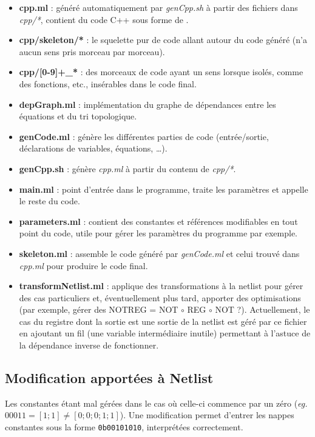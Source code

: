 \documentclass[11pt,a4paper]{article}
\begin{document}
\begin{itemize}
\item \textbf{cpp.ml} : généré automatiquement par \textit{genCpp.sh} à partir des fichiers dans \textit{cpp/*}, contient du code C++ sous forme de .
\item \textbf{cpp/skeleton/*} : le squelette pur de code allant autour du code généré (n'a aucun sens pris morceau par morceau).
\item \textbf{cpp/[0-9]+\_*} : des morceaux de code ayant un sens lorsque isolés, comme des fonctions, etc., insérables dans le code final.
\item \textbf{depGraph.ml} : implémentation du graphe de dépendances entre les équations et du tri topologique.
\item \textbf{genCode.ml} : génère les différentes parties de code (entrée/sortie, déclarations de variables, équations, \ldots).
\item \textbf{genCpp.sh} : génère \textit{cpp.ml} à partir du contenu de \textit{cpp/*}.
\item \textbf{main.ml} : point d'entrée dans le programme, traite les paramètres et appelle le reste du code.
\item \textbf{parameters.ml} : contient des constantes et références modifiables en tout point du code, utile pour gérer les paramètres du programme par exemple.
\item \textbf{skeleton.ml} : assemble le code généré par \textit{genCode.ml} et celui trouvé dans \textit{cpp.ml} pour produire le code final.
\item \textbf{transformNetlist.ml} : applique des transformations à la netlist pour gérer des cas particuliers et, éventuellement plus tard, apporter des optimisations (par exemple, gérer des NOTREG = NOT $\circ$ REG $\circ$ NOT ?). Actuellement, le cas du registre dont la sortie est une sortie de la netlist est géré par ce fichier en ajoutant un \og fil \fg{} (une variable intermédiaire inutile) permettant à l'astuce de la dépendance inverse de fonctionner.
\end{itemize}

\subsection{Modification apportées à Netlist}

Les constantes  étant mal gérées dans le cas où celle-ci commence par un zéro (\textit{eg.} $00011 = [1;1] \neq [0;0;0;1;1]$). Une modification permet d'entrer les nappes constantes sous la forme \lstinline`0b00101010`, interprétées correctement.
\end{document}
